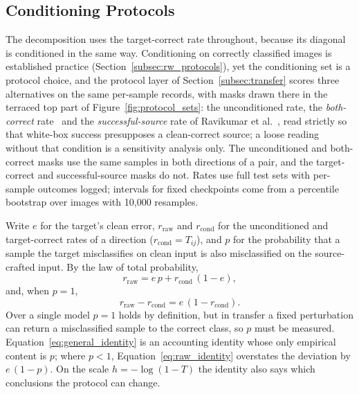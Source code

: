 \subsection{Conditioning Protocols}
\label{subsec:metrics}

The decomposition uses the target-correct rate throughout, because its diagonal is conditioned in the same way. Conditioning on correctly classified images is established practice (Section~\ref{subsec:rw_protocols}), yet the conditioning set is a protocol choice, and the protocol layer of Section~\ref{subsec:transfer} scores three alternatives on the same per-sample records, with masks drawn there in the terraced top part of Figure~\ref{fig:protocol_sets}: the unconditioned rate, the \emph{both-correct} rate~\cite{mahmood2021robustness, ravikumar2023trend} and the \emph{successful-source} rate of Ravikumar et al.~\cite{ravikumar2023trend}, read strictly so that white-box success presupposes a clean-correct source; a loose reading without that condition is a sensitivity analysis only. The unconditioned and both-correct masks use the same samples in both directions of a pair, and the target-correct and successful-source masks do not. Rates use full test sets with per-sample outcomes logged; intervals for fixed checkpoints come from a percentile bootstrap over images with 10{,}000 resamples.

Write $e$ for the target's clean error, $r_{\text{raw}}$ and $r_{\text{cond}}$ for the unconditioned and target-correct rates of a direction ($r_{\text{cond}} = T_{ij}$), and $p$ for the probability that a sample the target misclassifies on clean input is also misclassified on the source-crafted input. By the law of total probability,
\begin{equation}
r_{\text{raw}} = e\,p + r_{\text{cond}}\,(1 - e),
\label{eq:general_identity}
\end{equation}
and, when $p=1$,
\begin{equation}
r_{\text{raw}} - r_{\text{cond}} = e\,(1 - r_{\text{cond}}).
\label{eq:raw_identity}
\end{equation}
Over a single model $p=1$ holds by definition, but in transfer a fixed perturbation can return a misclassified sample to the correct class, so $p$ must be measured. Equation~\eqref{eq:general_identity} is an accounting identity whose only empirical content is $p$; where $p<1$, Equation~\eqref{eq:raw_identity} overstates the deviation by $e\,(1-p)$. On the scale $h = -\log(1-T)$ the identity also says which conclusions the protocol can change.

